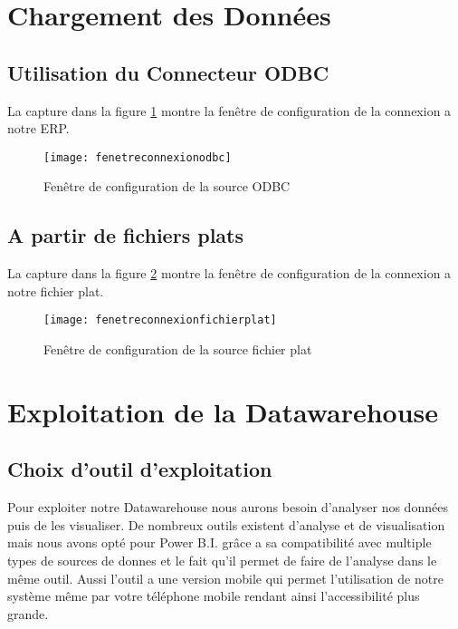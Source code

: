 \section{Chargement des Données}
\subsection{Utilisation du Connecteur ODBC}
La capture dans la figure \ref{fig:fenetreconnexionodbc} montre la fenêtre de configuration de la connexion a notre ERP.
\begin{figure}[H]
    \centering
    \texttt{[image: fenetreconnexionodbc]}
    \caption{Fenêtre de configuration de la source ODBC}
    \label{fig:fenetreconnexionodbc}
\end{figure}

\subsection{A partir de fichiers plats}
La capture dans la figure \ref{fig:fenetreconnexionfichierplat} montre la fenêtre de configuration de la connexion a notre fichier plat.
\begin{figure}[H]
    \centering
    \texttt{[image: fenetreconnexionfichierplat]}
    \caption{Fenêtre de configuration de la source fichier plat}
    \label{fig:fenetreconnexionfichierplat}
\end{figure}

\section{Exploitation de la Datawarehouse}
\subsection{Choix d'outil d'exploitation}
Pour exploiter notre Datawarehouse nous aurons besoin d’analyser nos données puis de les visualiser. De nombreux outils existent d’analyse et de visualisation mais nous avons opté pour Power B.I. grâce a sa compatibilité avec multiple types de sources de donnes et le fait qu’il permet de faire de l’analyse dans le même outil. Aussi l’outil a une version mobile qui permet l’utilisation de notre système même par votre téléphone mobile rendant ainsi l’accessibilité plus grande. 
